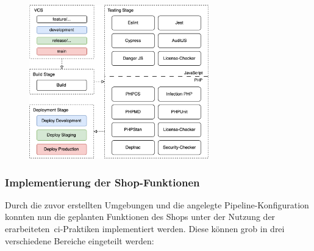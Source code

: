 \begin{figure}[H]
    \centering
    \includegraphics[width=0.69420\textwidth]{images/content/ci-pipeline-concept}
    \label{fig:ci-pipeline-concept}
\end{figure}

\subsubsection{Implementierung der Shop-Funktionen}

Durch die zuvor erstellten Umgebungen und die angelegte Pipeline-Konfiguration konnten nun die geplanten Funktionen des
Shops unter der Nutzung der erarbeiteten\ \acrshort{ci}-Praktiken implementiert werden.
Diese können grob in drei verschiedene Bereiche eingeteilt werden:

